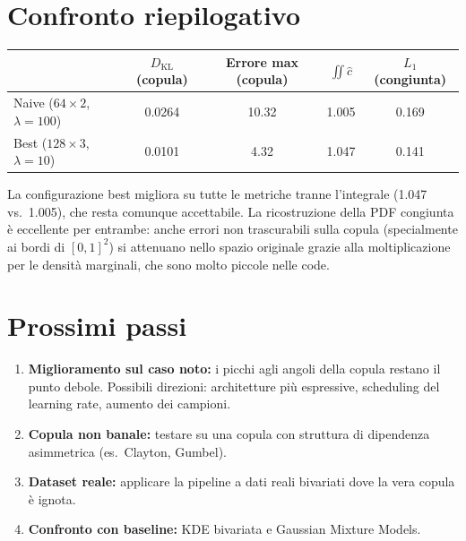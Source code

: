 \documentclass[11pt, a4paper]{article}
\begin{document}
\section{Confronto riepilogativo}

\begin{center}
\begin{tabular}{lcccc}
\toprule
& $D_{\mathrm{KL}}$ (copula) & Errore max (copula) & $\iint \hat{c}$ & $L_1$ (congiunta) \\
\midrule
Naive ($64 \times 2$, $\lambda\!=\!100$)  & 0.0264 & 10.32 & 1.005 & 0.169 \\
Best ($128 \times 3$, $\lambda\!=\!10$) & 0.0101 & 4.32  & 1.047 & 0.141 \\
\bottomrule
\end{tabular}
\end{center}

La configurazione best migliora su tutte le metriche tranne l'integrale (1.047 vs.\ 1.005), che resta comunque accettabile. La ricostruzione della PDF congiunta è eccellente per entrambe: anche errori non trascurabili sulla copula (specialmente ai bordi di $[0,1]^2$) si attenuano nello spazio originale grazie alla moltiplicazione per le densità marginali, che sono molto piccole nelle code.

\section{Prossimi passi}

\begin{enumerate}
    \item \textbf{Miglioramento sul caso noto:} i picchi agli angoli della copula restano il punto debole. Possibili direzioni: architetture più espressive, scheduling del learning rate, aumento dei campioni.
    \item \textbf{Copula non banale:} testare su una copula con struttura di dipendenza asimmetrica (es.\ Clayton, Gumbel).
    \item \textbf{Dataset reale:} applicare la pipeline a dati reali bivariati dove la vera copula è ignota.
    \item \textbf{Confronto con baseline:} KDE bivariata e Gaussian Mixture Models.
\end{enumerate}
\end{document}
